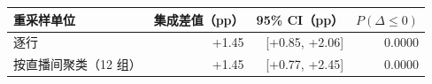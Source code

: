 \begin{tabular}{lrrr}
\toprule
重采样单位 & 集成差值（pp） & 95\% CI（pp） & $P(\Delta\leq0)$\\
\midrule
逐行 & +1.45 & [+0.85, +2.06] & 0.0000\\
按直播间聚类（12 组） & +1.45 & [+0.77, +2.45] & 0.0000\\
\bottomrule
\end{tabular}
